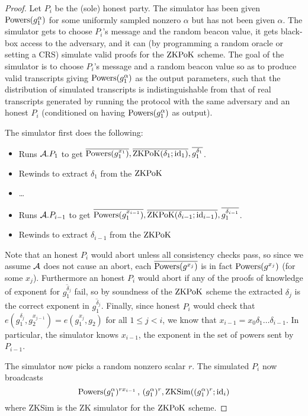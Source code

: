 \documentclass{article}
\newcommand{\?}{\stackrel{?}{=}}
\begin{document}
\begin{proof}
Let $P_i$ be the (sole) honest party. The simulator has been given $\mathrm{Powers}(g_1^\alpha)$ for some uniformly sampled nonzero $\alpha$ but has not been given $\alpha$. The simulator gets to choose $P_i$'s message and the random beacon value, it gets black-box access to the adversary, and it can (by programming a random oracle or setting a CRS) simulate valid proofs for the $\operatorname{ZKPoK}$ scheme. The goal of the simulator is to choose $P_i$'s message and a random beacon value so as to produce valid transcripts giving $\mathrm{Powers}(g_1^\alpha)$ as the output parameters, such that the distribution of simulated transcripts is indistinguishable from that of real transcripts generated by running the protocol with the same adversary and an honest $P_i$ (conditioned on having $\mathrm{Powers}(g_1^\alpha)$ as output).

The simulator first does the following:
\begin{itemize}
\item Runs $\mathcal{A}.P_{1}$ to get $\overline{\mathrm{Powers}(g_1^{x_1})}, \overline{\operatorname{ZKPoK}(\delta_1; \mathrm{id}_1)}, \overline{g_1^{\delta_1}}$.
\item Rewinds to extract $\delta_1$ from the $\operatorname{ZKPoK}$
\item \dots
\item Runs $\mathcal{A}.P_{i-1}$ to get $\overline{\mathrm{Powers}(g_1^{x_{i-1}})}, \overline{\operatorname{ZKPoK}(\delta_{i-1}; \mathrm{id}_{i-1})}, \overline{g_1^{\delta_{i-1}}}$.
\item Rewinds to extract $\delta_{i-1}$ from the $\operatorname{ZKPoK}$
\end{itemize}

Note that an honest $P_i$ would abort unless all consistency checks pass, so since we assume $\mathcal{A}$ does not cause an abort, each $\overline{\mathrm{Powers}(g^{x_j})}$ is in fact $\mathrm{Powers}(g^{x_j})$ (for some $x_j$). Furthermore an honest $P_i$ would abort if any of the proofs of knowledge of exponent for $\overline{g_1^{\delta_j}}$ fail, so by soundness of the $\operatorname{ZKPoK}$ scheme the extracted $\delta_j$ is the correct exponent in $\overline{g_1^{\delta_j}}$. Finally, since honest $P_i$ would check that $e(g_1^{\delta_j}, g_2^{x_{j-1}}) = e(g_1^{x_j}, g_2)$ for all $1 \le j < i$, we know that $x_{i-1} = x_0 \delta_1 \dots \delta_{i-1}$. In particular, the simulator knows $x_{i-1}$, the exponent in the set of powers sent by $P_{i-1}$.

The simulator now picks a random nonzero scalar $r$.
The simulated $P_i$ now broadcasts 
\[
\mathrm{Powers}(g_1^\alpha)^{r x_{i-1}} \,,\, (g_1^\alpha)^r, \mathrm{ZKSim}((g_1^{\alpha})^r; \mathrm{id}_i)
\]
where ZKSim is the ZK simulator for the $\operatorname{ZKPoK}$ scheme.


\end{proof}
\end{document}
